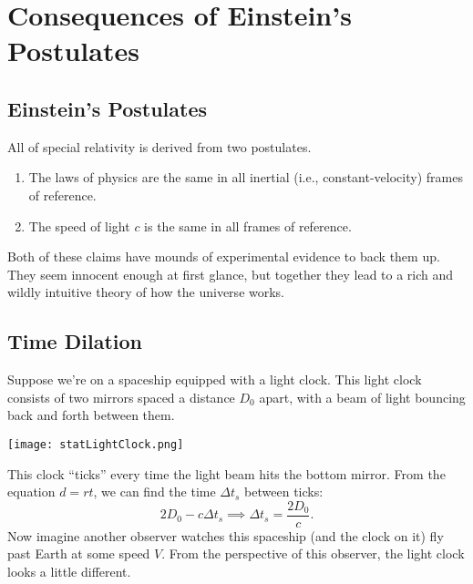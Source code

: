 \documentclass[../p023main.tex]{subfiles}
\begin{document}
\chapter{Consequences of Einstein's Postulates}
\section{Einstein's Postulates}
All of special relativity is derived from two postulates.
\begin{enumerate}
    \item The laws of physics are the same in all inertial (i.e., constant-velocity) frames of reference.
    \item The speed of light $c$ is the same in all frames of reference.
\end{enumerate}
Both of these claims have mounds of experimental evidence to back them up.
They seem innocent enough at first glance, but together they lead to a rich and wildly intuitive theory of how the universe works.

\section{Time Dilation}
Suppose we're on a spaceship equipped with a light clock.
This light clock consists of two mirrors spaced a distance $D_0$ apart, with a beam of light bouncing back and forth between them.
\begin{center}
    \texttt{[image: statLightClock.png]}
\end{center}
This clock ``ticks'' every time the light beam hits the bottom mirror.
From the equation $d = rt$, we can find the time $\Delta t_s$ between ticks:
\[ 2D_0 - c \Delta t_s \implies \Delta t_s = \frac{2D_0}{c}. \]
Now imagine another observer watches this spaceship (and the clock on it) fly past Earth at some speed $V$.
From the perspective of this observer, the light clock looks a little different.
\end{document}
